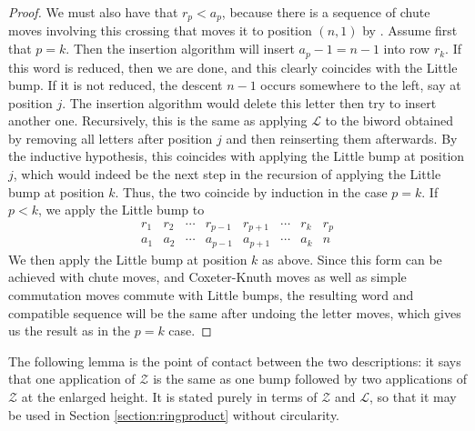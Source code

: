 \documentclass{amsart}
\let\origtodo\todo
\renewcommand{\todo}[1]{\origtodo[inline]{#1}}
\theoremstyle{definition}
\theoremstyle{remark}
\numberwithin{equation}{subsection}
\newcommand{\zeromap}{\mathcal{Z}}
\newcommand{\lmap}{\mathscr{L}}
\begin{document}
\begin{proof}
We must also have that $r_p < a_p$, because there is a sequence of chute moves involving this crossing that moves it to position $(n, 1)$ by \cite[Theorem~3.7]{bbrc}. Assume first that $p = k$.%
 Then the insertion algorithm will insert $a_p - 1=n-1$ into row $r_k$. If this word is reduced, then we are done, and this clearly coincides with the Little bump. If it is not reduced, the descent $n-1$ occurs somewhere to the left, say at position $j$. The insertion algorithm would delete this letter then try to insert another one. Recursively, this is the same as applying $\lmap$ to the biword obtained by removing all letters after position $j$ and then reinserting them afterwards. By the inductive hypothesis, this coincides with applying the Little bump at position $j$, which would indeed be the next step in the recursion of applying the Little bump at position $k$. Thus, the two coincide by induction in the case $p=k$. If $p<k$, we apply the Little bump to
 $$\begin{matrix}
r_1& r_2& \cdots & r_{p-1} &  r_{p+1} & \cdots & r_k& r_p\\
a_1& a_2& \cdots & a_{p-1} &  a_{p+1} & \cdots & a_k& n
\end{matrix}$$
We then apply the Little bump at position $k$ as above. Since this form can be achieved with chute moves, and Coxeter-Knuth moves \cite{hamaker2014relating} as well as simple commutation moves commute with Little bumps, the resulting word and compatible sequence will be the same after undoing the letter moves, which gives us the result as in the $p=k$ case.
\end{proof}

The following lemma is the point of contact between the two descriptions: it says that one application of $\zeromap$ is the same as one bump followed by two applications of $\zeromap$ at the enlarged height. It is stated purely in terms of $\zeromap$ and $\lmap$, so that it may be used in Section \ref{section:ringproduct} without circularity.
\end{document}
